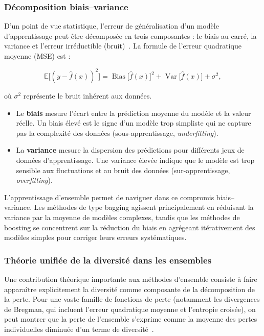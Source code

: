\subsubsection{Décomposition biais--variance}

D'un point de vue statistique, l'erreur de généralisation d'un modèle d'apprentissage peut être
décomposée en trois composantes : le biais au carré, la variance et l'erreur irréductible (bruit)~\cite{wikip_bias_variance,utd_ensemble_lecture}.
La formule de l'erreur quadratique moyenne (MSE) est :

\begin{equation}
  \mathbb{E}\bigl[(y - \hat{f}(x))^2\bigr]
  = \operatorname{Bias}\bigl[\hat{f}(x)\bigr]^2
  + \operatorname{Var}\bigl[\hat{f}(x)\bigr]
  + \sigma^2,
\end{equation}

où $\sigma^2$ représente le bruit inhérent aux données.

\begin{itemize}
  \item Le \textbf{biais} mesure l'écart entre la prédiction moyenne du modèle et la valeur réelle. Un biais
  élevé est le signe d'un modèle trop simpliste qui ne capture pas la complexité des
  données (sous-apprentissage, \emph{underfitting}).

  \item La \textbf{variance} mesure la dispersion des prédictions pour différents jeux de données
  d'apprentissage. Une variance élevée indique que le modèle est trop sensible aux
  fluctuations et au bruit des données (sur-apprentissage, \emph{overfitting}).
\end{itemize}

L'apprentissage d'ensemble permet de naviguer dans ce compromis biais--variance. Les
méthodes de type bagging agissent principalement en réduisant la variance par la moyenne de
modèles complexes, tandis que les méthodes de boosting se concentrent sur la réduction du
biais en agrégeant itérativement des modèles simples pour corriger leurs erreurs systématiques.

\subsubsection{Théorie unifiée de la diversité dans les ensembles}

Une contribution th{\'e}orique importante aux m{\'e}thodes d'ensemble consiste {\`a} faire appara{\^i}tre
explicitement la diversit{\'e} comme composante de la d{\'e}composition de la perte. Pour une vaste
famille de fonctions de perte (notamment les divergences de Bregman, qui incluent l'erreur
quadratique moyenne et l'entropie crois{\'e}e), on peut montrer que la perte de l'ensemble s'exprime
comme la moyenne des pertes individuelles diminu{\'e}e d'un terme de diversit{\'e}~\cite{kuncheva_diversity_ensemble}.

